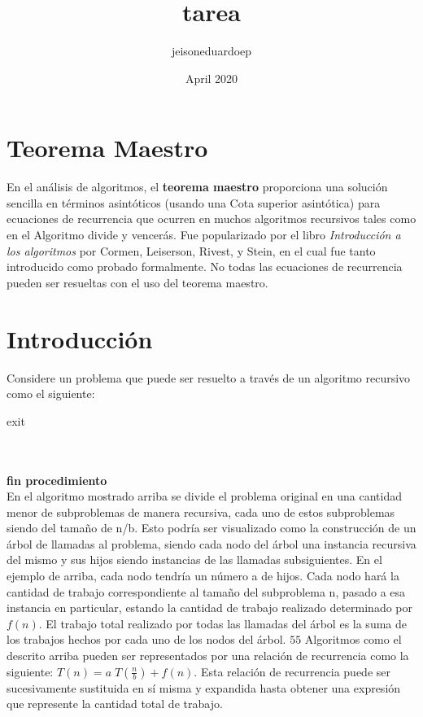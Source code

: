 \documentclass{article}
\title{tarea}
\author{jeisoneduardoep }
\date{April 2020}
\begin{document}
\maketitle

\section*{Teorema Maestro}
\hline 
En el análisis de algoritmos, el \textbf{teorema maestro} proporciona una solución sencilla en términos asintóticos (usando una Cota superior asintótica) para ecuaciones de recurrencia que ocurren en muchos algoritmos recursivos tales como en el Algoritmo divide y vencerás. Fue popularizado por el libro \textit{Introducción a los algoritmos} por Cormen, Leiserson, Rivest, y Stein, en el cual fue tanto introducido como probado formalmente. No todas las ecuaciones de recurrencia pueden ser resueltas con el uso del teorema maestro.

\tableofcontents
\section{Introducción}
\hline
Considere un problema que puede ser resuelto a través de un algoritmo recursivo como el siguiente:

\begin{algorithmic}
 exit\\\
     \\\
     \State{T(n/b)}
     \state{T(n/b)}\\
\end{algorithmic}
\textbf{fin procedimiento}\\


 En el algoritmo mostrado arriba se divide el problema original en una cantidad menor de subproblemas de manera recursiva, cada uno de estos subproblemas siendo del tamaño de n/b. Esto podría ser visualizado como la construcción de un árbol de llamadas al problema, siendo cada nodo del árbol una instancia recursiva del mismo y sus hijos siendo instancias de las llamadas subsiguientes. En el ejemplo de arriba, cada nodo tendría un número a de hijos. Cada nodo hará la cantidad de trabajo correspondiente al tamaño del subproblema n, pasado a esa instancia en particular, estando la cantidad de trabajo realizado determinado por  $f(n)$. El trabajo total realizado por todas las llamadas del árbol es la suma de los trabajos hechos por cada uno de los nodos del árbol.
$55$
Algoritmos como el descrito arriba pueden ser representados por una relación de recurrencia como la siguiente: $ T(n)=a\;T\left({\frac {n}{b}}\right)+f(n)$. Esta relación de recurrencia puede ser sucesivamente sustituida en sí misma y expandida hasta obtener una expresión que represente la cantidad total de trabajo.\cite{duke}
\end{document}

